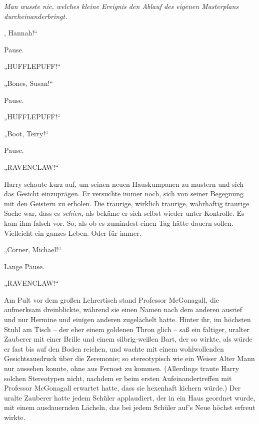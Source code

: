 
\emph{Man wusste nie, welches kleine Ereignis den Ablauf des eigenen Masterplans durcheinanderbringt.}

\later

, Hannah!“

\hplettrineextrapara
Pause.

„HUFFLEPUFF!“

„Bones, Susan!“

Pause.

„HUFFLEPUFF!“

„Boot, Terry!“

Pause.

„RAVENCLAW!“

Harry schaute kurz auf, um seinen neuen Hauskumpanen zu mustern und sich das Gesicht einzuprägen. Er versuchte immer noch, sich von seiner Begegnung mit den Geistern zu erholen. Die traurige, wirklich traurige, wahrhaftig traurige Sache war, dass es \emph{schien}, als bekäme er sich selbst wieder unter Kontrolle. Es kam ihm falsch vor. So, als ob es zumindest einen Tag hätte dauern sollen. Vielleicht ein ganzes Leben. Oder für immer.

„Corner, Michael!“

Lange Pause.

„RAVENCLAW!“

Am Pult vor dem großen Lehrertisch stand Professor McGonagall, die aufmerksam dreinblickte, während sie einen Namen nach dem anderen ausrief und nur Hermine und einigen anderen zugelächelt hatte. Hinter ihr, im höchsten Stuhl am Tisch – der eher einem goldenen Thron glich – saß ein faltiger, uralter Zauberer mit einer Brille und einem silbrig-weißen Bart, der so wirkte, als würde er fast bis auf den Boden reichen, und wachte mit einem wohlwollenden Gesichtsausdruck über die Zeremonie; so stereotypisch wie ein Weiser Alter Mann nur aussehen konnte, ohne aus Fernost zu kommen. (Allerdings traute Harry solchen Stereotypen nicht, nachdem er beim ersten Aufeinandertreffen mit Professor McGonagall erwartet hatte, dass sie hexenhaft kichern würde.) Der uralte Zauberer hatte jedem Schüler applaudiert, der in ein Haus geordnet wurde, mit einem ausdauernden Lächeln, das bei jedem Schüler auf's Neue höchst erfreut wirkte.

